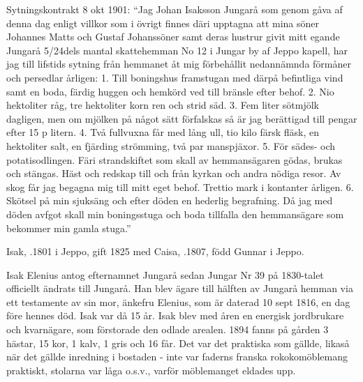 Sytningskontrakt 8 okt 1901: ``Jag Johan Isaksson Jungarå som genom gåva af denna dag enligt villkor som i övrigt finnes däri 	upptagna att mina söner Johannes Matts och Gustaf Johanssöner samt deras hustrur givit mitt egande Jungarå 5/24dels mantal skattehemman No 12 i Jungar by af Jeppo kapell, har jag till lifstids sytning från hemmanet åt mig förbehållit nedannämnda förmåner och persedlar årligen: 1. Till boningshus framstugan med därpå befintliga vind samt en boda, färdig huggen och hemkörd ved till bränsle efter behof. 2. Nio hektoliter råg, tre hektoliter korn ren och strid säd. 3. Fem liter sötmjölk dagligen, men om mjölken på något sätt förfalskas så är jag berättigad till pengar efter 15 p litern. 4. Två fullvuxna får med lång ull, tio kilo färsk fläsk, en hektoliter salt, en fjärding strömming, två par manspjäxor. 5. För sädes- och potatisodlingen. Färi strandskiftet som skall av hemmansägaren gödas, brukas och stängas. Häst och redskap till och från kyrkan och andra nödiga resor. Av skog får jag begagna mig till mitt eget behof. Trettio mark i kontanter årligen. 6. Skötsel på min sjuksäng och efter döden en hederlig begrafning. Då jag med döden avfgot skall min boningsstuga och boda tillfalla den hemmansägare som bekommer min gamla stuga.''


Isak, .1801 i Jeppo, gift 1825 med Caisa, .1807, född Gunnar i Jeppo.
\begin{jhchildren}
  \item {}
  \item {}
  \item {}
  \item {}
  \item {}
  \item {}
  \item {}
  \item {}
  \item {}
\end{jhchildren}
Isak Elenius antog efternamnet Jungarå sedan Jungar Nr 39 på 1830-talet officiellt ändrats till Jungarå. Han blev ägare till hälften av Jungarå hemman via ett testamente av sin mor, änkefru Elenius, som är daterad 10 sept 1816, en dag före hennes död. Isak var då 15 år. Isak blev med åren en energisk jordbrukare och kvarnägare, som förstorade den odlade arealen. 1894 fanns på gården 3 hästar, 15 kor, 1 kalv, 1 gris och 16 får. Det var det praktiska som gällde, likaså när det gällde inredning i bostaden - inte var faderns franska rokokomöblemang praktiskt, stolarna var låga o.s.v., varför möblemanget eldades upp.

